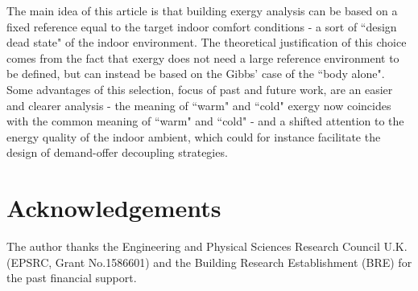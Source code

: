 \documentclass[10pt]{extarticle} %
\begin{document}
The main idea of this article is that building exergy analysis can be based on a fixed reference equal to the target indoor comfort conditions - a sort of ``design dead state" of the indoor environment. The theoretical justification of this choice comes from the fact that exergy does not need a large reference environment to be defined, but can instead be based on the Gibbs' case of the ``body alone". Some advantages of this selection, focus of past and future work, are an easier and clearer analysis - the meaning of ``warm" and ``cold" exergy now coincides with the common meaning of ``warm" and ``cold" - and a shifted attention to the energy quality of the indoor ambient, which could for instance facilitate the design of demand-offer decoupling strategies.


\section*{Acknowledgements}

The author thanks the Engineering and Physical Sciences Research Council U.K. (EPSRC, Grant No.1586601) and the Building Research Establishment (BRE) for the past financial support.

{\small %
 
}

\vfill \break
\end{document}
